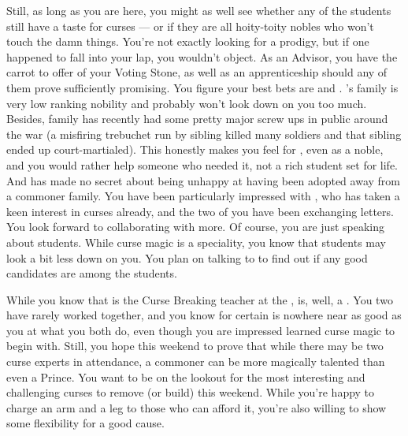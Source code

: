 \documentclass[char]{GL2020}
\begin{document}
Still, as long as you are here, you might as well see whether any of the students still have a taste for curses — or if they are all hoity-toity nobles who won't touch the damn things. You're not exactly looking for a prodigy, but if one happened to fall into your lap, you wouldn't object. As an Advisor, you have the carrot to offer of your Voting Stone, as well as an apprenticeship should any of them prove sufficiently promising. You figure your best bets are \cLibAssist{\full} and \cAdopted{\full}. \cLibAssist{}'s family is very low ranking nobility and probably won't look down on you too much. Besides, \cLibAssist{\their} family has recently had some pretty major screw ups in public around the war (a misfiring trebuchet run by \cLibAssist{\their} sibling killed many soldiers and that sibling ended up court-martialed). This honestly makes you feel for \cLibAssist{\them}, even as a noble, and you would rather help someone who needed it, not a rich student set for life. And \cAdopted{} has made no secret about being unhappy at having been adopted away from a commoner family. You have been particularly impressed with \cAdopted{}, who has taken a keen interest in curses already, and the two of you have been exchanging letters. You look forward to collaborating with \cAdopted{\them} more. Of course, you are just speaking about \pFarm{} students. While curse magic is a \pFarm{} speciality, you know that \pTech{} students may look a bit less down on you. You plan on talking to \cAssistantScientist{} to find out if any good candidates are among the \pTech{} students.

While you know that \cPrince{\full} is the Curse Breaking teacher at the \pSc{}, \cPrince{} is, well, a \cPrince{\Heir}. You two have rarely worked together, and you know for certain \cPrince{} is nowhere near as good as you at what you both do, even though you are impressed \cPrince{\they} learned curse magic to begin with. Still, you hope this weekend to prove that while there may be two curse experts in attendance, a commoner can be more magically talented than even a Prince. You want to be on the lookout for the most interesting and challenging curses to remove (or build) this weekend. While you're happy to charge an arm and a leg to those who can afford it, you're also willing to show some flexibility for a good cause.
\end{document}
